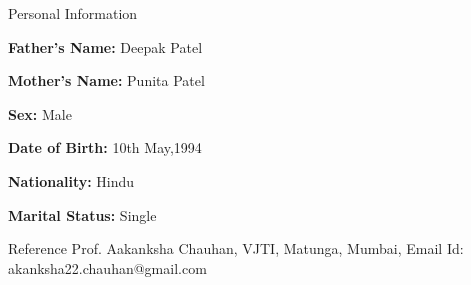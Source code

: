 \documentclass{resume} %
\begin{document}
\begin{rSection}{Personal Information}
	\item \textbf{Father’s Name:} Deepak Patel
	\item \textbf{Mother’s Name: } Punita Patel
	\item \textbf{Sex:} Male
	\item \textbf{Date of Birth:} 10th May,1994 
	\item \textbf{Nationality: } Hindu
	\item \textbf{Marital Status:}	Single
\end{rSection}

\newpage
\begin{rSection}{Reference}
	Prof. Aakanksha Chauhan,
	\newline
	VJTI, Matunga, Mumbai,
	\newline
	Email Id: akanksha22.chauhan@gmail.com
	
\end{rSection}
\end{document}
